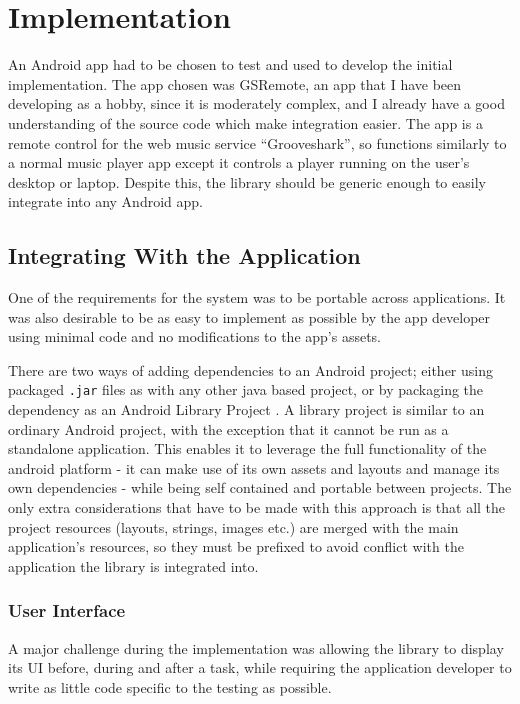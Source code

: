 \chapter{Implementation}

An Android app had to be chosen to test and used to develop the initial
implementation. The app chosen was GSRemote, an app that I have
been developing as a hobby, since it is moderately complex, and I already
have a good understanding of the source code which make integration easier.
The app is a remote control for the web music service ``Grooveshark'',
so functions similarly to a normal music player app except it controls
a player running on the user's desktop or laptop.
Despite this, the library should be generic enough to easily integrate 
into any Android app.

\section{Integrating With the Application}

One of the requirements for the system was to be portable across
applications. It was also desirable to be as easy to implement
as possible by the app developer using minimal code and no
modifications to the app's assets.

There are two ways of adding dependencies to an Android project;
either using packaged \verb/.jar/ files as with any other java based
project, or by packaging the dependency as an Android Library
Project \cite{android-library}. A library project is similar to
an ordinary Android project, with the exception that it cannot
be run as a standalone application. This enables it to leverage
 the full functionality of the android
platform - it can make use of its own assets and layouts and manage
its own dependencies - while being self contained and portable
between projects. The only extra considerations that have to be
made with this approach is that all the project resources
(layouts, strings, images etc.) are merged with the main application's
resources, so they must be prefixed to avoid conflict with
the application the library is integrated into.

\subsection{User Interface}

A major challenge during the implementation was allowing the library
to display its UI before, during and after a task, while requiring
the application developer to write as little code specific to the
testing as possible.

